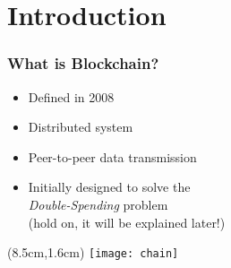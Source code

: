 \section{Introduction}
\begin{frame}
  \frametitle{What is Blockchain?}

  \begin{itemize}
   \item<1-> Defined in 2008
   \item<2-> Distributed system
   \item<3-> Peer-to-peer data transmission
   \item<4-> Initially designed to solve the \\ \textit{Double-Spending} problem
\\ (hold on, it will be explained later!)
  \end{itemize}

 \begin{textblock*}{5cm}(8.5cm,1.6cm)
  \texttt{[image: chain]}
 \end{textblock*}

\end{frame}
